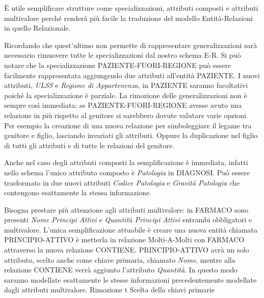 \documentclass{article}
\begin{document}
È utile semplificare strutture come specializzazioni, attributi composti e attributi multivalore perché renderà più facile la traduzione del modello Entità-Relazioni in quello Relazionale.

Ricordando che quest'ultimo non permette di rappresentare generalizzazioni sarà necessario rimuovere tutte le specializzazioni dal nostro schema E-R.
Si può notare che la specializzazione PAZIENTE-FUORI-REGIONE può essere facilmente rappresentata aggiungendo due attributi all'entità PAZIENTE.
I nuovi attributi, \textit{ULSS} e \textit{Regione di Appartenenza}, in PAZIENTE saranno facoltativi poiché la specializzazione è parziale.
La rimozione delle generalizzazioni non è sempre così immediata: se PAZIENTE-FUORI-REGIONE avesse avuto una relazione in più rispetto al genitore si sarebbero dovute valutare varie opzioni.
Per esempio la creazione di una nuova relazione per simboleggiare il legame tra genitore e figlio, lasciando invariati gli attributi.
Oppure la duplicazione nel figlio di tutti gli attributi e di tutte le relazioni del genitore.  

Anche nel caso degli attributi composti la semplificazione è immediata, infatti nello schema l'unico attributo composto è \textit{Patologia} in DIAGNOSI.
Può essere trasformato in due nuovi attributi \textit{Codice Patologia} e \textit{Gravità Patologia} che contengono esattamente la stessa informazione.

Bisogna prestare più attenzione agli attributi multivalore: in FARMACO sono presenti \textit{Nome Principi Attivi} e \textit{Quantità Principi Attivi} entrambi obbligatori e multivalore.
L'unica semplificazione attuabile è creare una nuova entità chiamata PRINCIPIO-ATTIVO è metterla in relazione Molti-A-Molti con FARMACO attraverso la nuova relazione CONTIENE.
PRINCIPIO-ATTIVO avrà un solo attributo, scelto anche come chiave primaria, chiamato \textit{Nome}, mentre alla relazione CONTIENE verrà aggiunto l'attributo \textit{Quantità}.
In questo modo saranno modellate esattamente le stesse informazioni precedentemente modellate dagli attributi multivalore.
Rimozione t
Scelta della chiavi primarie
\end{document}
